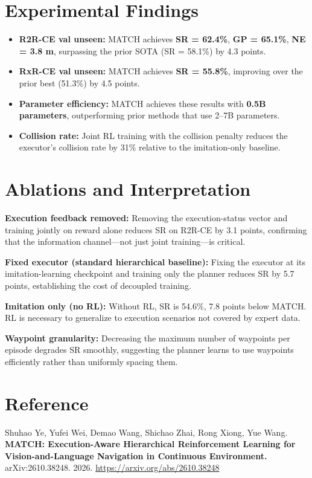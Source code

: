 \documentclass[10pt,twocolumn]{article}
\begin{document}
\section{Experimental Findings}

\begin{itemize}[itemsep=2pt,parsep=0pt]
  \item \textbf{R2R-CE val unseen:} MATCH achieves
    \textbf{SR = 62.4\%}, \textbf{GP = 65.1\%},
    \textbf{NE = 3.8 m}, surpassing the prior SOTA
    (SR = 58.1\%) by 4.3 points.
  \item \textbf{RxR-CE val unseen:} MATCH achieves
    \textbf{SR = 55.8\%}, improving over the prior best (51.3\%)
    by 4.5 points.
  \item \textbf{Parameter efficiency:} MATCH achieves these results
    with \textbf{0.5B parameters}, outperforming prior
    methods that use 2--7B parameters.
  \item \textbf{Collision rate:} Joint RL training with the
    collision penalty reduces the executor's collision rate by
    31\% relative to the imitation-only baseline.
\end{itemize}

\section{Ablations and Interpretation}

\textbf{Execution feedback removed:}
Removing the execution-status vector and training jointly on reward
alone reduces SR on R2R-CE by 3.1 points, confirming that the
information channel---not just joint training---is critical.

\textbf{Fixed executor (standard hierarchical baseline):}
Fixing the executor at its imitation-learning checkpoint and training
only the planner reduces SR by 5.7 points, establishing the cost
of decoupled training.

\textbf{Imitation only (no RL):}
Without RL, SR is 54.6\%, 7.8 points below MATCH. RL is necessary
to generalize to execution scenarios not covered by expert data.

\textbf{Waypoint granularity:}
Decreasing the maximum number of waypoints per episode degrades
SR smoothly, suggesting the planner learns to use waypoints
efficiently rather than uniformly spacing them.

\section*{Reference}

Shuhao Ye, Yufei Wei, Demao Wang, Shichao Zhai, Rong Xiong, Yue Wang.
\textbf{MATCH: Execution-Aware Hierarchical Reinforcement Learning for
Vision-and-Language Navigation in Continuous Environment.}
arXiv:2610.38248. 2026.
\url{https://arxiv.org/abs/2610.38248}
\end{document}
